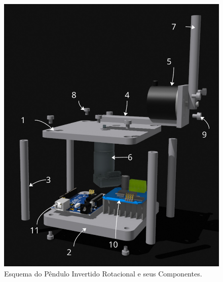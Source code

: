 \documentclass[9pt,a4paper,twocolumn,twoside]{tau-class/tau}
\begin{document}
    \begin{figure}[H]
        \centering
        \includegraphics[width=0.8\columnwidth]{figures/itens.png}
        \caption{Esquema do Pêndulo Invertido Rotacional e seus Componentes.}
        \label{fig:itens}
    \end{figure}
    
\end{document}
